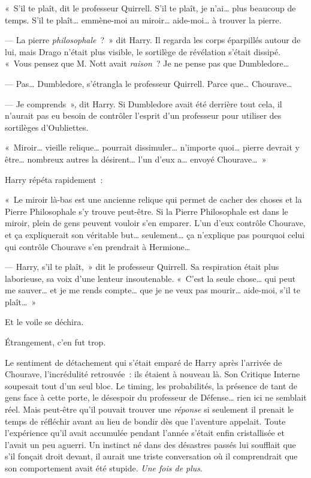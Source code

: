 «~S'il te plaît, dit le professeur Quirrell.
S'il te plaît, je n'ai… plus beaucoup de temps.
S'il te plaît… emmène-moi au miroir… aide-moi… à trouver la pierre.

--- La pierre \emph{philosophale}~?~»
dit Harry.
Il regarda les corps éparpillés autour de lui, mais Drago n'était plus visible, le sortilège de révélation s'était dissipé.
«~Vous pensez que M. Nott avait \emph{raison}~?
Je ne pense pas que Dumbledore…

--- Pas…
Dumbledore, s'étrangla le professeur Quirrell.
Parce que…
Chourave…

--- Je comprends~», dit Harry.
Si Dumbledore avait été derrière tout cela, il n'aurait pas eu besoin de contrôler l'esprit d'un professeur pour utiliser des sortilèges d'Oubliettes.

«~Miroir… vieille relique… pourrait dissimuler… n'importe quoi… pierre devrait y être… nombreux autres la désirent… l'un d'eux a… envoyé Chourave…~»

Harry répéta rapidement~:

«~Le miroir là-bas est une ancienne relique qui permet de cacher des choses et la Pierre Philosophale s'y trouve peut-être.
Si la Pierre Philosophale est dans le miroir, plein de gens peuvent vouloir s'en emparer.
L'un d'eux contrôle Chourave, et ça expliquerait son véritable but… seulement… ça n'explique pas pourquoi celui qui contrôle Chourave s'en prendrait à Hermione…

--- Harry, s'il te plaît,~» dit le professeur Quirrell.
Sa respiration était plus laborieuse, sa voix d'une lenteur insoutenable.
«~C'est la seule chose… qui peut me sauver… et je me rends compte… que je ne veux pas mourir… aide-moi, s'il te plaît…~»

Et le voile se déchira.

Étrangement, c'en fut trop.

Le sentiment de détachement qui s'était emparé de Harry après l'arrivée de Chourave, l'incrédulité retrouvée~: ils étaient à nouveau là.
Son Critique Interne soupesait tout d'un seul bloc.
Le timing, les probabilités, la présence de tant de gens face à cette porte, le désespoir du professeur de Défense… rien ici ne semblait réel.
Mais peut-être qu'il pouvait trouver une \emph{réponse} si seulement il prenait le temps de réfléchir avant au lieu de bondir dès que l'aventure appelait.
Toute l'expérience qu'il avait accumulée pendant l'année s'était enfin cristallisée et l'avait un peu aguerri.
Un instinct né dans des désastres passés lui soufflait que s'il fonçait droit devant, il aurait une triste conversation où il comprendrait que son comportement avait été stupide.
\emph{Une fois de plus}.

